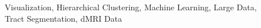 \documentclass[runningheads,a4paper]{llncs}
\newcommand{\keywords}[1]{\par\addvspace\baselineskip
\noindent\keywordname\enspace\ignorespaces#1}
\begin{document}


\keywords{ Visualization, Hierarchical Clustering, Machine Learning, Large Data,\\ Tract Segmentation, dMRI Data}













%



%
\end{document}
